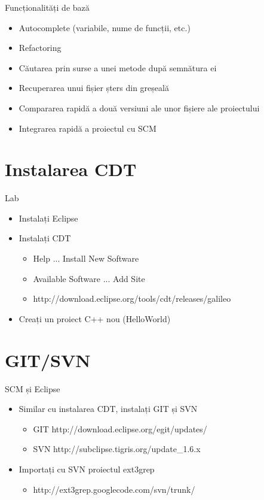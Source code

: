 \documentclass{beamer}
\begin{document}
\begin{frame}{Funcționalități de bază}
		\begin{itemize} 
		\pause
	  \item Autocomplete (variabile, nume de funcții, etc.)
	  \pause
	  \item Refactoring 
		\pause
	  \item Căutarea prin surse a unei metode după semnătura ei
  	\pause
	  \item Recuperarea unui fișier șters din greșeală
  	\pause
	  \item Compararea rapidă a două versiuni ale unor fișiere ale proiectului 
		\pause
	  \item Integrarea rapidă a proiectul cu SCM
  	\end{itemize}
\end{frame}

\section{Instalarea CDT}

\begin{frame}{Lab}
  \begin{itemize}
  \item Instalați Eclipse
  \pause
  \item Instalați CDT
		\begin{itemize} 
		\pause
	  \item Help ... Install New Software
  	\pause
	  \item Available Software ... Add Site
  	\item http://download.eclipse.org/tools/cdt/releases/galileo
  	\end{itemize}
  \item Creați un proiect C++ nou (HelloWorld)
  \end{itemize}
\end{frame}

\section{GIT/SVN}

\begin{frame}{SCM și Eclipse}
  \begin{itemize}
  \item Similar cu instalarea CDT, instalați GIT și SVN
	\pause
		\begin{itemize}
		\item GIT http://download.eclipse.org/egit/updates/
		\pause
		\item SVN http://subclipse.tigris.org/update\_1.6.x
		\pause
		\end{itemize}
  \item Importați cu SVN proiectul ext3grep 
  	\begin{itemize}
		\item http://ext3grep.googlecode.com/svn/trunk/ 
  	\end{itemize}
  \end{itemize}
\end{frame}
\end{document}
